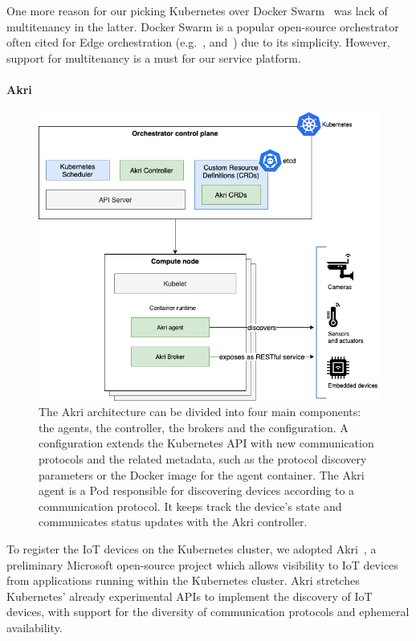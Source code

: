 One more reason for our picking Kubernetes over Docker Swarm~\cite{docker-swarm} was lack of multitenancy in the latter. 
Docker Swarm is a popular open-source orchestrator often cited for Edge orchestration (e.g.~\cite{bellavista2017feasibility}, and~\cite{ismail2015evaluation}) due to its simplicity. However, support for multitenancy is a must for our service platform.

\paragraph{Akri}\label{p:akri}

\begin{figure}[ht]
\centering
\includegraphics[width=\columnwidth]{figures/akri}
\caption{The Akri architecture can be divided into four main components: the agents, the controller, the brokers and the configuration. A configuration extends the Kubernetes API with new communication protocols and the related metadata, such as the protocol discovery parameters or the Docker image for the agent container. The Akri agent is a Pod responsible for discovering devices according to a communication protocol. It keeps track the device's state and communicates status updates with the Akri controller.}
\label{fig:akri}
\end{figure}

To register the IoT devices on the Kubernetes cluster, we adopted Akri~\cite{akri}, a preliminary Microsoft open-source project which allows visibility to IoT devices from applications running within the Kubernetes cluster. Akri stretches Kubernetes' already experimental APIs to implement the discovery of IoT devices, with support for the diversity of communication protocols and ephemeral availability.

